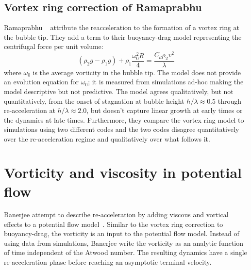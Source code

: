 \subsection{Vortex ring correction of Ramaprabhu}

Ramaprabhu \etal ~\cite{Ramaprabhu2012} attribute the reacceleration to the formation of a vortex ring at the bubble tip.
They add a term to their buoyancy-drag model representing the centrifugal force per unit volume:
\begin{equation}
\left(\rho_2 g - \rho_1 g\right) + \rho_1 \frac{\omega_0^2 R}{ 4} = \frac{C_d \rho_2 v^2}{\lambda}
\end{equation}
where $\omega_0$ is the average vorticity in the bubble tip.
The model does not provide an evolution equation for $\omega_0$; it is measured from simulations ad-hoc making the model descriptive but not predictive.
The model agrees qualitatively, but not quantitatively, from the onset of stagnation at bubble height $h / \lambda \approx 0.5$ through re-acceleration at $h/\lambda \approx 2.0$, but doesn't capture linear growth at early times or the dynamics at late times.
Furthermore, they compare the vortex ring model to simulations using two different codes and the two codes disagree quantitatively over the re-acceleration regime and qualitatively over what follows it.

\section{Vorticity and viscosity in potential flow}

Banerjee \etal attempt to describe re-acceleration by adding viscous and vortical effects to a potential flow model~\cite{Banerjee2011}.
Similar to the vortex ring correction to buoyancy-drag, the vorticity is an input to the potential flow model.
Instead of using data from simulations, Banerjee \etal write the vorticity as an analytic function of time independent of the Atwood number.
The resulting dynamics have a single re-acceleration phase before reaching an asymptotic terminal velocity.

